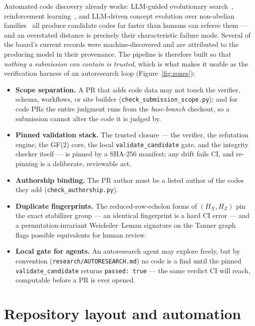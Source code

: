 \documentclass[11pt]{article}
\newcommand{\HX}{H_X}
\newcommand{\HZ}{H_Z}
\begin{document}
	Automated code discovery already works: LLM-guided evolutionary
	search~\cite{cruzbenito2026evolutionary}, reinforcement
	learning~\cite{he2025reinforcement}, and LLM-driven concept evolution
	over non-abelian families~\cite{liu2026concept} all produce candidate codes far faster than humans can referee them ---
	and an overstated distance is precisely their characteristic failure
	mode. Several of the board's current records were machine-discovered and
	are attributed to the producing model in their provenance. The pipeline
	is therefore built so that \emph{nothing a submission can contain is
	trusted}, which is what makes it usable as the verification harness of an
	autoresearch loop (Figure~\ref{fig:zones}):
	\begin{itemize}[nosep]
		\item \textbf{Scope separation.} A PR that adds code data may not
		touch the verifier, schema, workflows, or site builder
		(\texttt{check\_submission\_scope.py}); and for code PRs the entire
		judgment runs from the \emph{base-branch} checkout, so a submission
		cannot alter the code it is judged by.
		\item \textbf{Pinned validation stack.} The trusted closure --- the
		verifier, the refutation engine, the GF(2) core, the local
		\texttt{validate\_candidate} gate, and the integrity checker itself
		--- is pinned by a SHA-256 manifest; any drift fails CI, and
		re-pinning is a deliberate, reviewable act.
		\item \textbf{Authorship binding.} The PR author must be a listed
		author of the codes they add
		(\texttt{check\_authorship.py}).
		\item \textbf{Duplicate fingerprints.} The reduced-row-echelon forms
		of $(\HX,\HZ)$ pin the exact stabilizer group --- an identical
		fingerprint is a hard CI error --- and a permutation-invariant
		Weisfeiler--Leman signature on the Tanner graph flags possible
		equivalents for human review.
		\item \textbf{Local gate for agents.} An autoresearch agent may
		explore freely, but by convention (\texttt{research/AUTORESEARCH.md})
		no code is a find until the pinned \texttt{validate\_candidate}
		returns \texttt{passed:\,true} --- the same verdict CI will reach,
		computable before a PR is ever opened.
	\end{itemize}

	\section{Repository layout and automation}
\end{document}
